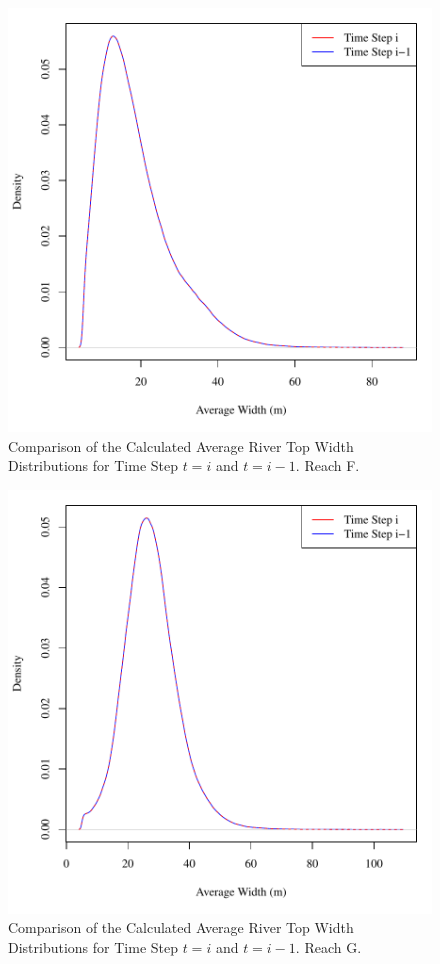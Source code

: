 \begin{figure}[htbp]
\begin{center}
	\includegraphics[width=6in]{"Figures/Results_DSR/G widthToday F"}
	\caption{Comparison of the Calculated Average River Top Width Distributions for Time Step $t=i$ and $t=i-1$.  Reach F.}
\end{center}
\end{figure}

\begin{figure}[htbp]
\begin{center}
	\includegraphics[width=6in]{"Figures/Results_DSR/G widthToday G"}
	\caption{Comparison of the Calculated Average River Top Width Distributions for Time Step $t=i$ and $t=i-1$.  Reach G.}
\end{center}
\end{figure}